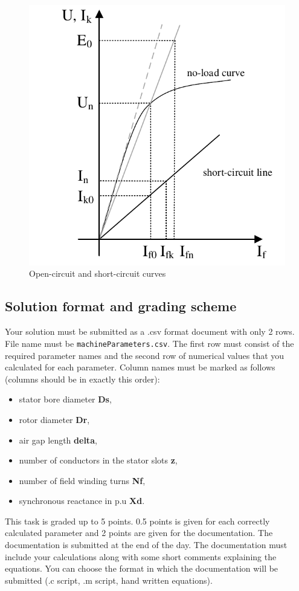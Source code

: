 \documentclass{article}
\begin{document}
\begin{figure}[!htb]
			\centering
			\includegraphics[scale=0.5]{Images/NoLoadCurveShortCircuit.pdf}
			\caption{Open-circuit and short-circuit curves}
			\label{fig:02}
\end{figure}
\newpage
\subsection{Solution format and grading scheme}
Your solution must be submitted as a .csv format document with only 2 rows. File name must be 
\texttt{machineParameters.csv}. The first row must consist of the required parameter names and the second row of numerical values that you calculated for each parameter. Column names must be marked as follows (columns should be in exactly this order):
\begin{itemize}
    \item stator bore diameter \textbf{Ds},
    \item rotor diameter \textbf{Dr},
    \item air gap length \textbf{delta},
    \item number of conductors in the stator slots \textbf{z},
    \item number of field winding turns \textbf{Nf},
    \item synchronous reactance in p.u \textbf{Xd}.
\end{itemize}
This task is graded up to 5 points. 0.5 points is given for  each correctly calculated parameter and 2 points are given for the documentation. The documentation is submitted at the end of the day. The documentation must include your calculations along with some short comments explaining the equations. You can choose the format in which the documentation will be submitted (.c script, .m script, hand written equations).
	
\end{document}
